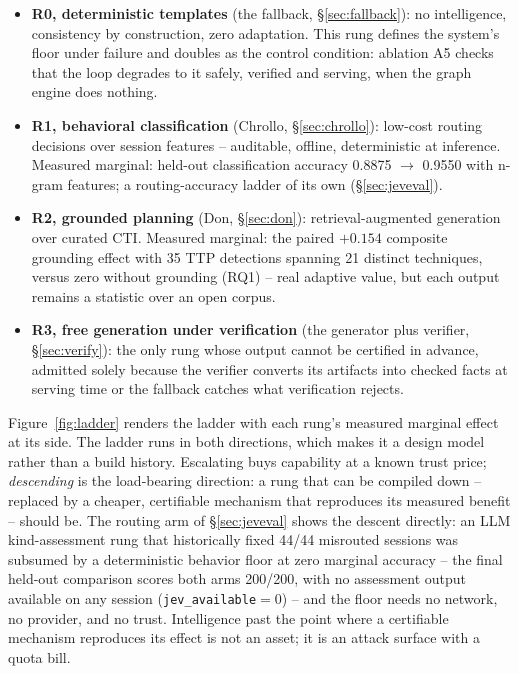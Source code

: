 \begin{itemize}
\item \textbf{R0, deterministic templates} (the fallback,
\S\ref{sec:fallback}): no intelligence, consistency by
construction, zero adaptation. This rung defines the system's floor
under failure and doubles as the control condition: ablation A5 checks that the
loop degrades to it safely, verified and serving, when the graph engine
does nothing.
\item \textbf{R1, behavioral classification} (Chrollo,
\S\ref{sec:chrollo}): low-cost routing decisions over session
features -- auditable, offline, deterministic at inference. Measured
marginal: held-out classification accuracy 0.8875 $\to$ 0.9550 with
n-gram features; a routing-accuracy ladder of its own
(\S\ref{sec:jeveval}).
\item \textbf{R2, grounded planning} (Don, \S\ref{sec:don}):
retrieval-augmented generation over curated CTI. Measured marginal: the
paired $+0.154$ composite grounding effect with 35 TTP detections
spanning 21 distinct techniques, versus zero without grounding (RQ1) -- real adaptive value, but each output remains a
statistic over an open corpus.
\item \textbf{R3, free generation under verification} (the generator
plus verifier, \S\ref{sec:verify}): the only rung whose output cannot be
certified in advance, admitted solely because the verifier converts its
artifacts into checked facts at serving time or the fallback catches
what verification rejects.
\end{itemize}

\noindent Figure~\ref{fig:ladder} renders the ladder with each rung's
measured marginal effect at its side.
The ladder runs in both directions, which makes it a design
model rather than a build history. Escalating buys capability at
a known trust price; \emph{descending} is the load-bearing direction: a
rung that can be compiled down -- replaced by a cheaper, certifiable
mechanism that reproduces its measured benefit -- should be. The routing
arm of \S\ref{sec:jeveval} shows the descent directly: an LLM
kind-assessment rung that historically fixed 44/44 misrouted sessions was
subsumed by a deterministic behavior floor at zero marginal accuracy --
the final held-out comparison scores both arms 200/200, with no
assessment output available on any session (\texttt{jev\_available}$=0$)
-- and the floor needs no network, no provider, and no trust.
Intelligence past the point
where a certifiable mechanism reproduces its effect is not an asset; it
is an attack surface with a quota bill.

